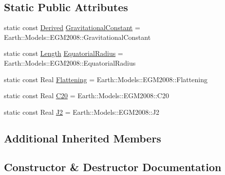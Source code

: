 \subsection*{Static Public Attributes}
\begin{DoxyCompactItemize}
\item 
static const \hyperlink{classlibrary_1_1physics_1_1units_1_1_derived}{Derived} \hyperlink{classlibrary_1_1physics_1_1env_1_1obj_1_1celest_1_1_earth_a06d0e71a63d0b8e3b85fb8e03d4e9a0d}{Gravitational\+Constant} = Earth\+::\+Models\+::\+E\+G\+M2008\+::\+Gravitational\+Constant
\item 
static const \hyperlink{classlibrary_1_1physics_1_1units_1_1_length}{Length} \hyperlink{classlibrary_1_1physics_1_1env_1_1obj_1_1celest_1_1_earth_a55828a36604fb87c8232e5c542fd5fe1}{Equatorial\+Radius} = Earth\+::\+Models\+::\+E\+G\+M2008\+::\+Equatorial\+Radius
\item 
static const Real \hyperlink{classlibrary_1_1physics_1_1env_1_1obj_1_1celest_1_1_earth_aaba560b789bbcfe8d4e0a945a87218bb}{Flattening} = Earth\+::\+Models\+::\+E\+G\+M2008\+::\+Flattening
\item 
static const Real \hyperlink{classlibrary_1_1physics_1_1env_1_1obj_1_1celest_1_1_earth_ac23d264acdac73360807fff7ce11c2a7}{C20} = Earth\+::\+Models\+::\+E\+G\+M2008\+::\+C20
\item 
static const Real \hyperlink{classlibrary_1_1physics_1_1env_1_1obj_1_1celest_1_1_earth_a1a72d6717f224aad24853666d50fb8a1}{J2} = Earth\+::\+Models\+::\+E\+G\+M2008\+::\+J2
\end{DoxyCompactItemize}
\subsection*{Additional Inherited Members}


\subsection{Constructor \& Destructor Documentation}
\mbox{\label{classlibrary_1_1physics_1_1env_1_1obj_1_1celest_1_1_earth_a43e41a95f19ee7a3043a17e69b4ec33c}} 
